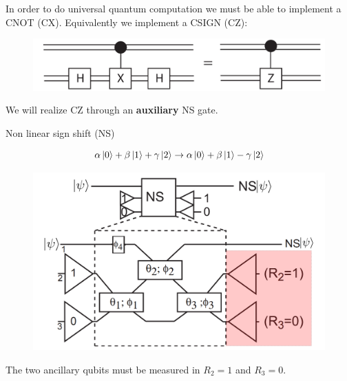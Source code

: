 \documentclass{beamer}
\begin{document}
\begin{frame}
\begin{center}
In order to do universal quantum computation we must be able to implement a CNOT (CX). Equivalently we implement a CSIGN (CZ):

\begin{figure}[!htb]
\centering
\includegraphics[scale=.25]{immagini/cnotcsign.png}
\end{figure}

\begin{block}{}
\begin{center}
We will realize CZ through an \textbf{auxiliary} NS gate.
\end{center}
\end{block}{}

\end{center}
\end{frame}

\begin{frame}{Non linear sign shift (NS)}
\begin{center}
\begin{equation*}
\alpha \ket{0} + \beta \ket{1} + \gamma \ket{2} \rightarrow \alpha \ket{0} + \beta \ket{1} - \gamma \ket{2}
\end{equation*}

\begin{figure}[!htb]
\centering
\includegraphics[scale=.20]{immagini/ns.png}
\end{figure}

The two ancillary qubits must be measured in $R_2 = 1$ and $R_3 = 0$.

\end{center}
\end{frame}
\end{document}

